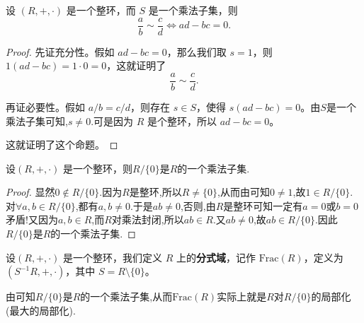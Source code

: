 \documentclass[../../main.tex]{subfiles}
\begin{document}
\begin{proposition}\label{proposition整环的局部化中两个元素等价的充要条件}
设 $(R, +, \cdot)$ 是一个整环，而 $S$ 是一个乘法子集，则
\[\frac{a}{b} \sim \frac{c}{d} \iff ad - bc = 0 .\]
\end{proposition}
\begin{proof}
先证充分性。假如 $ad - bc = 0$，那么我们取 $s = 1$，则 $1(ad - bc) = 1 \cdot 0 = 0$，这就证明了
\[\frac{a}{b} \sim \frac{c}{d} .\]

再证必要性。假如 $a/b = c/d$，则存在 $s \in S$，使得 $s(ad - bc) = 0$。由$S$是一个乘法子集可知,$s \neq 0$.可是因为 $R$ 是个整环，所以 $ad - bc = 0$。

这就证明了这个命题。

\end{proof}

\begin{proposition}\label{proposition:R/0一定是整环R的乘法子集}
设$(R, +, \cdot)$ 是一个整环，则$R/\{0\}$是$R$的一个乘法子集.
\end{proposition}
\begin{proof}
显然$0\notin R/\{0\}$.因为$R$是整环,所以$R\ne \{0\}$,从而由可知$0\ne 1$,故$1\in R/\{0\}.$对$\forall a,b\in R/\{0\}$,都有$a,b\ne 0.$于是$ab\ne 0$,否则,由$R$是整环可知一定有$a=0$或$b=0$矛盾!又因为$a,b\in R$,而$R$对乘法封闭,所以$ab\in R$.又$ab\ne 0$,故$ab\in R/\{0\}.$因此$R/\{0\}$是$R$的一个乘法子集.

\end{proof}

\begin{definition}[分式域]
设$(R, +, \cdot)$ 是一个整环，我们定义 $R$ 上的\textbf{分式域}，记作 $\mathrm{Frac}(R)$，定义为 $(S^{-1}R,+,\cdot)$，其中 $S = R \setminus \{0\}$。
\end{definition}
\begin{note}
由可知$R/\{0\}$是$R$的一个乘法子集,从而$\mathrm{Frac}(R)$实际上就是$R$对$R/\{0\}$的局部化(最大的局部化).
\end{note}
\end{document}
